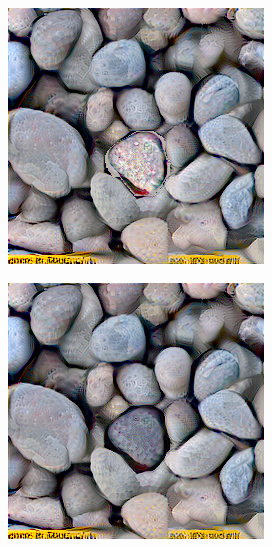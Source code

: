 \begin{figure}[]
\begin{subfigure}{\textwidth}
\begin{subfigure}{0.24\textwidth}
            \caption*{}
        \end{subfigure}
        \hfill
        \begin{subfigure}{0.24\textwidth}
            \centering
            \includegraphics[width=\textwidth]{images/04-experiment01/pebbles/1000/one_im.jpg}
            \caption*{}
        \end{subfigure}
        \hfill
        \begin{subfigure}{0.24\textwidth}
            \centering
            \includegraphics[width=\textwidth]{images/04-experiment01/pebbles/1000/one_proj.jpg}
            \caption*{}
        \end{subfigure}


\end{subfigure}
\end{figure}
